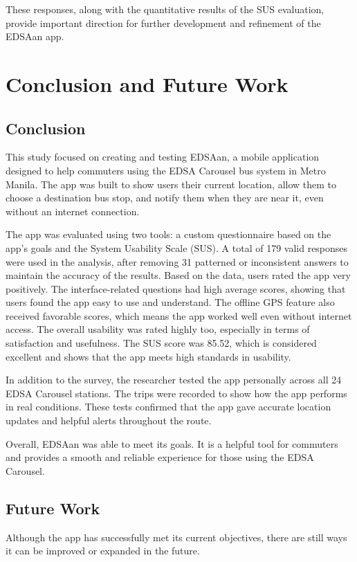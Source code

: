 \documentclass[journal]{./IEEE/IEEEtran}
\begin{document}
These responses, along with the quantitative results of the SUS evaluation, provide important direction for further development and refinement of the EDSAan app.

\section{Conclusion and Future Work}
\subsection{Conclusion}
This study focused on creating and testing EDSAan, a mobile application designed to help commuters using the EDSA Carousel bus system in Metro Manila. The app was built to show users their current location, allow them to choose a destination bus stop, and notify them when they are near it, even without an internet connection.

The app was evaluated using two tools: a custom questionnaire based on the app’s goals and the System Usability Scale (SUS). A total of 179 valid responses were used in the analysis, after removing 31 patterned or inconsistent answers to maintain the accuracy of the results. Based on the data, users rated the app very positively. The interface-related questions had high average scores, showing that users found the app easy to use and understand. The offline GPS feature also received favorable scores, which means the app worked well even without internet access. The overall usability was rated highly too, especially in terms of satisfaction and usefulness. The SUS score was 85.52, which is considered excellent and shows that the app meets high standards in usability.

In addition to the survey, the researcher tested the app personally across all 24 EDSA Carousel stations. The trips were recorded to show how the app performs in real conditions. These tests confirmed that the app gave accurate location updates and helpful alerts throughout the route.

Overall, EDSAan was able to meet its goals. It is a helpful tool for commuters and provides a smooth and reliable experience for those using the EDSA Carousel.

\subsection{Future Work}
Although the app has successfully met its current objectives, there are still ways it can be improved or expanded in the future.
\end{document}
